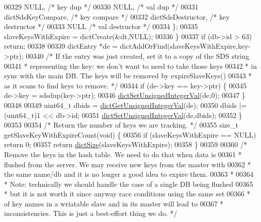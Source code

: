 \begin{DoxyCode}
{{{{{00329             NULL,                       \textcolor{comment}{/* key dup */}
00330             NULL,                       \textcolor{comment}{/* val dup */}
00331             dictSdsKeyCompare,          \textcolor{comment}{/* key compare */}
00332             dictSdsDestructor,          \textcolor{comment}{/* key destructor */}
00333             NULL                        \textcolor{comment}{/* val destructor */}
00334         \};
00335         slaveKeysWithExpire = dictCreate(&dt,NULL);
00336     \}
00337     \textcolor{keywordflow}{if} (db->id > 63) \textcolor{keywordflow}{return};
00338 
00339     dictEntry *de = dictAddOrFind(slaveKeysWithExpire,key->ptr);
00340     \textcolor{comment}{/* If the entry was just created, set it to a copy of the SDS string}
00341 \textcolor{comment}{     * representing the key: we don't want to need to take those keys}
00342 \textcolor{comment}{     * in sync with the main DB. The keys will be removed by expireSlaveKeys()}
00343 \textcolor{comment}{     * as it scans to find keys to remove. */}
00344     \textcolor{keywordflow}{if} (de->key == key->ptr) \{
00345         de->key = sdsdup(key->ptr);
00346         \hyperlink{dict_8h_aa846a3c28ad69004259435fd44246e10}{dictSetUnsignedIntegerVal}(de,0);
00347     \}
00348 
00349     uint64\_t dbids = \hyperlink{dict_8h_ad65abe818fa141e537800699668a7f09}{dictGetUnsignedIntegerVal}(de);
00350     dbids |= (uint64\_t)1 << db->id;
00351     \hyperlink{dict_8h_aa846a3c28ad69004259435fd44246e10}{dictSetUnsignedIntegerVal}(de,dbids);
00352 \}
00353 
00354 \textcolor{comment}{/* Return the number of keys we are tracking. */}
00355 size\_t getSlaveKeyWithExpireCount(\textcolor{keywordtype}{void}) \{
00356     \textcolor{keywordflow}{if} (slaveKeysWithExpire == NULL) \textcolor{keywordflow}{return} 0;
00357     \textcolor{keywordflow}{return} \hyperlink{dict_8h_af193430dd3d5579a52b194512f72c1f0}{dictSize}(slaveKeysWithExpire);
00358 \}
00359 
00360 \textcolor{comment}{/* Remove the keys in the hash table. We need to do that when data is}
00361 \textcolor{comment}{ * flushed from the server. We may receive new keys from the master with}
00362 \textcolor{comment}{ * the same name/db and it is no longer a good idea to expire them.}
00363 \textcolor{comment}{ *}
00364 \textcolor{comment}{ * Note: technically we should handle the case of a single DB being flushed}
00365 \textcolor{comment}{ * but it is not worth it since anyway race conditions using the same set}
00366 \textcolor{comment}{ * of key names in a wriatable slave and in its master will lead to}
00367 \textcolor{comment}{ * inconsistencies. This is just a best-effort thing we do. */}
}}}}}
\end{DoxyCode}
